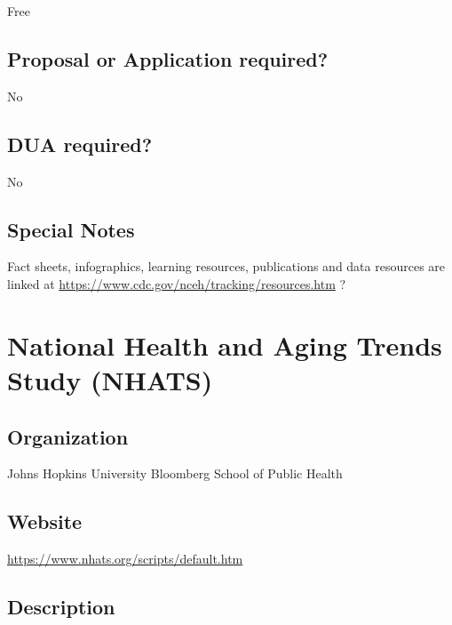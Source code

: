 \documentclass[
]{book}
\begin{document}
Free

\hypertarget{proposal-or-application-required-47}{%
\section{Proposal or Application required?}\label{proposal-or-application-required-47}}

No

\hypertarget{dua-required-47}{%
\section{DUA required?}\label{dua-required-47}}

No

\hypertarget{special-notes-47}{%
\section{Special Notes}\label{special-notes-47}}

Fact sheets, infographics, learning resources, publications and data resources are linked at \url{https://www.cdc.gov/nceh/tracking/resources.htm} ?

\mainmatter

\hypertarget{national-health-and-aging-trends-study-nhats}{%
\chapter{National Health and Aging Trends Study (NHATS)}\label{national-health-and-aging-trends-study-nhats}}

\hypertarget{organization-48}{%
\section{Organization}\label{organization-48}}

Johns Hopkins University Bloomberg School of Public Health

\hypertarget{website-48}{%
\section{Website}\label{website-48}}

\url{https://www.nhats.org/scripts/default.htm}

\hypertarget{description-48}{%
\section{Description}\label{description-48}}
\end{document}
